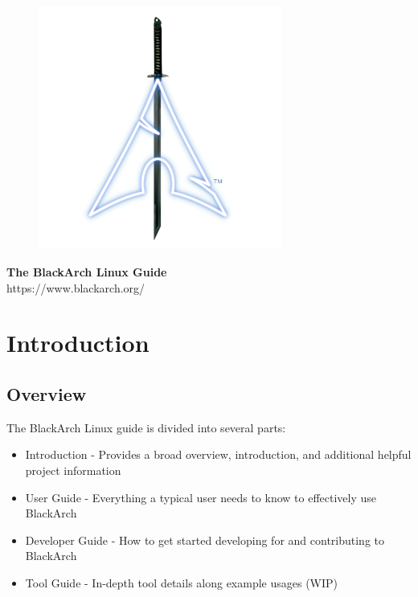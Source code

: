 \documentclass[a4paper, oneside, 11pt]{book}
\begin{document}
\pagestyle{empty}
\begin{center}
\begin{figure}[htbp]
\centering
\vspace{0.5cm}
\includegraphics[width=8cm]{images/logo.png}
\label{fig:logo}
\end{figure}
\vspace{0.5cm}
\Huge{\textbf{The BlackArch Linux Guide}}\\
\vspace{1cm}
\Large{\color{blue}https://www.blackarch.org/}\\
\vspace{0.5cm}
\end{center}
\newpage
\tableofcontents
\newpage
\pagestyle{fancy}


\chapter{Introduction}

\section{Overview}
The BlackArch Linux guide is divided into several parts:
\begin{itemize}
\item Introduction - Provides a broad overview, introduction, and additional helpful project information
\item User Guide - Everything a typical user needs to know to effectively use BlackArch
\item Developer Guide - How to get started developing for and contributing to BlackArch
\item Tool Guide - In-depth tool details along example usages (WIP)
\end{itemize}
\end{document}
